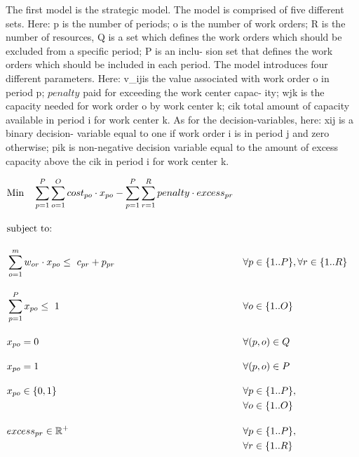 \documentclass[runningheads]{llncs}
\begin{document}
The first model is the strategic model. The model is comprised of five different sets. Here: p
is the number of periods; o is the number of work
orders; R is the number of resources, Q is a
set which defines the work orders which should
be excluded from a specific period; P is an inclu-
sion set that defines the work orders which should
be included in each period. The model introduces
four different parameters. Here: v_{ij}is the value
associated with work order o in period p; $penalty$ paid for exceeding the work center capac-
ity; wjk is the capacity needed for work order o
by work center k; cik total amount of capacity
available in period i for work center k. As for the
decision-variables, here: xij is a binary decision-
variable equal to one if work order i is in period
j and zero otherwise; pik is non-negative decision
variable equal to the amount of excess capacity
above the cik in period i for work center k.


\begin{alignat}{2}
    &\text{Min} \quad \sum_{p = 1}^{P} \sum_{o = 1}^{O} cost_{po} \cdot x_{po} - \sum_{p = 1}^{P} \sum_{r = 1}^R penalty \cdot excess_{pr} \label{eqn:objective_function_strategic} \\[1em]
    &\text{subject to:} \notag\\[1em]
    &\sum_{o=1}^m w_{or} \cdot x_{po} \leq \ c_{pr} + p_{pr} \quad  && \forall p \in \{1..P\}, \forall r \in \{1..R\}\label{eqn:capacity_constraint} \\[1em]
    &\sum_{p = 1}^{P} x_{po} \leq \ 1 \quad                         && \forall o \in \{1..O\}   \label{eqn:single_workorder_constraint}\\[1em]
    &x_{po} = 0                                                     && \forall (p, o) \in Q \quad  \label{eqn:exclusion_constraint} \\[1em]
    &x_{po} = 1                                                     && \forall (p, o) \in P \quad  \label{eqn:inclusion_constraint}\\[1em]
    &x_{po} \in \{0, 1\}                                            && \forall p \in \{1..P\}, \notag \\
    &&& \forall o \in \{1..O\}                 \label{eqn:x_integrality_constraint}\\[1em] 
    &excess_{pr} \in \mathbb{R}^{+}                                      && \forall p \in \{1..P\}, \notag \\
    &&&\forall r \in \{1..R\}                  \label{eqn:p_non_negativity_constraint}
\end{alignat}
\end{document}
